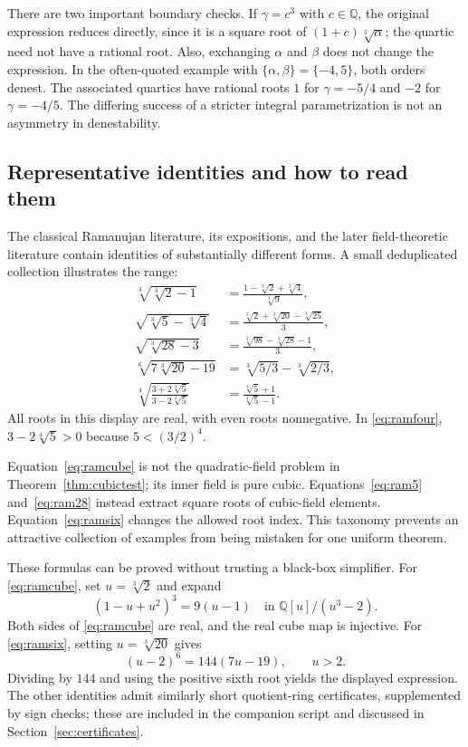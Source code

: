 \documentclass[11pt,a4paper]{article}
\newcommand{\Q}{\mathbb{Q}}
\newcommand{\cbrt}[1]{\sqrt[3]{#1}}
\theoremstyle{definition}
\theoremstyle{remark}
\numberwithin{equation}{section}
\begin{document}
There are two important boundary checks. If $\gamma=c^3$ with $c\in\Q$, the original expression reduces directly, since it is a square root of $(1+c)\cbrt\alpha$; the quartic need not have a rational root. Also, exchanging $\alpha$ and $\beta$ does not change the expression. In the often-quoted example with $\{\alpha,\beta\}=\{-4,5\}$, both orders denest. The associated quartics have rational roots $1$ for $\gamma=-5/4$ and $-2$ for $\gamma=-4/5$. The differing success of a stricter integral parametrization is not an asymmetry in denestability.\cite{honsbeek2005,sury}

\subsection{Representative identities and how to read them}

The classical Ramanujan literature, its expositions, and the later field-theoretic literature contain identities of substantially different forms. A small deduplicated collection illustrates the range:\cite{ramanujan,berndtII,berndtchan1997,berndtchan1998,elia,bumby,honsbeek2005}
\begin{align}
 \cbrt{\cbrt2-1}
   &=\frac{1-\cbrt2+\cbrt4}{\cbrt9},\label{eq:ramcube}\\
 \sqrt{\cbrt5-\cbrt4}
   &=\frac{\cbrt2+\cbrt{20}-\cbrt{25}}3,\label{eq:ram5}\\
 \sqrt{\cbrt{28}-3}
   &=\frac{\cbrt{98}-\cbrt{28}-1}3,\label{eq:ram28}\\
 \sqrt[6]{7\cbrt{20}-19}
   &=\cbrt{5/3}-\cbrt{2/3},\label{eq:ramsix}\\
 \sqrt[4]{\frac{3+2\sqrt[4]5}{3-2\sqrt[4]5}}
   &=\frac{\sqrt[4]5+1}{\sqrt[4]5-1}.\label{eq:ramfour}
\end{align}
All roots in this display are real, with even roots nonnegative. In \eqref{eq:ramfour}, $3-2\sqrt[4]5>0$ because $5<(3/2)^4$.

Equation~\eqref{eq:ramcube} is not the quadratic-field problem in Theorem~\ref{thm:cubictest}; its inner field is pure cubic. Equations~\eqref{eq:ram5} and~\eqref{eq:ram28} instead extract square roots of cubic-field elements. Equation~\eqref{eq:ramsix} changes the allowed root index. This taxonomy prevents an attractive collection of examples from being mistaken for one uniform theorem.

These formulas can be proved without trusting a black-box simplifier. For \eqref{eq:ramcube}, set $u=\cbrt2$ and expand
\[
 (1-u+u^2)^3=9(u-1)
 \quad\text{in }\Q[u]/(u^3-2).
\]
Both sides of \eqref{eq:ramcube} are real, and the real cube map is injective. For \eqref{eq:ramsix}, setting $u=\cbrt{20}$ gives
\[
 (u-2)^6=144(7u-19),\qquad u>2.
\]
Dividing by $144$ and using the positive sixth root yields the displayed expression. The other identities admit similarly short quotient-ring certificates, supplemented by sign checks; these are included in the companion script and discussed in Section~\ref{sec:certificates}.
\end{document}
